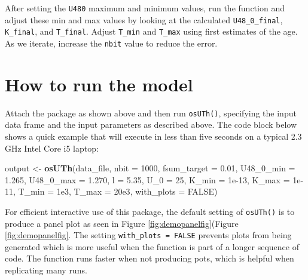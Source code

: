 \documentclass[]{elsarticle} %
\newenvironment{Shaded}{\begin{snugshade}}{\end{snugshade}}
\newcommand{\DataTypeTok}[1]{\textcolor[rgb]{0.13,0.29,0.53}{#1}}
\newcommand{\DecValTok}[1]{\textcolor[rgb]{0.00,0.00,0.81}{#1}}
\newcommand{\FloatTok}[1]{\textcolor[rgb]{0.00,0.00,0.81}{#1}}
\newcommand{\KeywordTok}[1]{\textcolor[rgb]{0.13,0.29,0.53}{\textbf{#1}}}
\newcommand{\NormalTok}[1]{#1}
\newcommand{\OtherTok}[1]{\textcolor[rgb]{0.56,0.35,0.01}{#1}}
\newcommand{\StringTok}[1]{\textcolor[rgb]{0.31,0.60,0.02}{#1}}
\begin{document}
After setting the \texttt{U480} maximum and minimum values, run the function and adjust these min and max values by looking at the calculated \texttt{U48\_0\_final}, \texttt{K\_final}, and \texttt{T\_final}. Adjust \texttt{T\_min} and \texttt{T\_max} using first estimates of the age. As we iterate, increase the \texttt{nbit} value to reduce the error.

\newpage

\hypertarget{how-to-run-the-model}{%
\section{How to run the model}\label{how-to-run-the-model}}

Attach the package as shown above and then run \texttt{osUTh()}, specifying the input data frame and the input parameters as described above. The code block below shows a quick example that will execute in less than five seconds on a typical 2.3 GHz Intel Core i5 laptop:

\begin{Shaded}
\begin{Highlighting}[]
\NormalTok{output <-}\StringTok{ }\KeywordTok{osUTh}\NormalTok{(data_file,}
                   \DataTypeTok{nbit =} \DecValTok{1000}\NormalTok{,}
                   \DataTypeTok{fsum_target =} \FloatTok{0.01}\NormalTok{,}
                   \DataTypeTok{U48_0_min =} \FloatTok{1.265}\NormalTok{,}
                   \DataTypeTok{U48_0_max =} \FloatTok{1.270}\NormalTok{,}
                   \DataTypeTok{l =} \FloatTok{5.35}\NormalTok{,}
                   \DataTypeTok{U_0 =} \DecValTok{25}\NormalTok{,}
                   \DataTypeTok{K_min =} \FloatTok{1e-13}\NormalTok{,}
                   \DataTypeTok{K_max =} \FloatTok{1e-11}\NormalTok{,}
                   \DataTypeTok{T_min =} \FloatTok{1e3}\NormalTok{,}
                   \DataTypeTok{T_max =} \FloatTok{20e3}\NormalTok{,}
                   \DataTypeTok{with_plots =} \OtherTok{FALSE}\NormalTok{)}
\end{Highlighting}
\end{Shaded}

For efficient interactive use of this package, the default setting of \texttt{osUTh()} is to produce a panel plot as seen in Figure \ref{fig:demopanelfig}(Figure \ref{fig:demopanelfig}. The setting \texttt{with\_plots\ =\ FALSE} prevents plots from being generated which is more useful when the function is part of a longer sequence of code. The function runs faster when not producing pots, which is helpful when replicating many runs.
\end{document}
